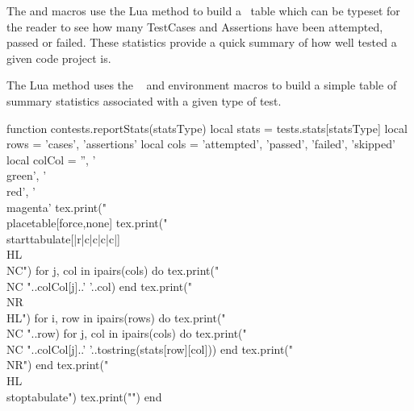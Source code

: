 The \type{\reportMkIVStats} and \type{\reportLuaStats} macros use the 
 Lua method to build a \ConTeXt\ table which can be 
typeset for the reader to see how many TestCases and Assertions have been 
attempted, passed or failed. These statistics provide a quick summary of 
how well tested a given code project is. 

\startMkIVCode
\def\reportMkIVStats{%
  \directlua{thirddata.contests.reportStats('mkiv')}
}

\def\reportLuaStats{%
  \directlua{thirddata.contests.reportStats('lua')}
}
\stopMkIVCode

The  Lua method uses the \ConTeXt\ \type{\placetable} 
and  environment macros to build a simple table of summary 
statistics associated with a given type of test. 

\startLuaCode
function contests.reportStats(statsType)
  local stats = tests.stats[statsType]
  local rows = { 'cases', 'assertions' }
  local cols =
    { 'attempted', 'passed', 'failed', 'skipped' }
  local colCol = { '', '\\green', '\\red', '\\magenta' }
  tex.print("\\placetable[force,none]{}{%
  tex.print("\\starttabulate[|r|c|c|c|c|]\\HL\\NC")
  for j, col in ipairs(cols) do
    tex.print("\\NC "..colCol[j]..' '..col)
  end
  tex.print("\\NR\\HL")
  for i, row in ipairs(rows) do
    tex.print("\\NC "..row)
    for j, col in ipairs(cols) do
      tex.print("\\NC "..colCol[j]..' '..tostring(stats[row][col]))
    end
    tex.print("\\NR")
  end
  tex.print("\\HL\\stoptabulate")
  tex.print("}")
end
\stopLuaCode

\stopchapter